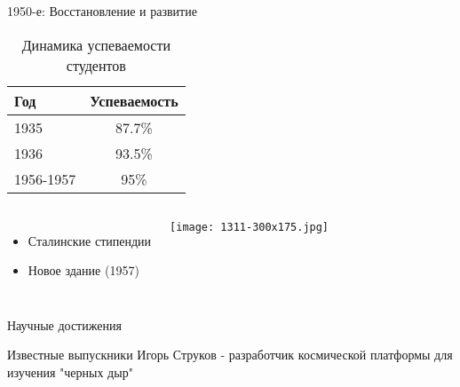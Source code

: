 \documentclass[12pt]{beamer}
\begin{document}
\begin{frame}{1950-е: Восстановление и развитие}
    \begin{table}
        \centering
        \begin{tabular}{lc}
            \toprule
            Год & Успеваемость \\
            \midrule
            1935 & 87.7\% \\
            1936 & 93.5\% \\
            1956-1957 & 95\% \\
            \bottomrule
        \end{tabular}
        \caption{Динамика успеваемости студентов}
    \end{table}
    
    \begin{columns}
        \begin{itemize}
            \item Сталинские стипендии
            \item Новое здание (1957)
        \end{itemize}
        
        \texttt{[image: 1311-300x175.jpg]}
    \end{columns}
\end{frame}

\begin{frame}{Научные достижения}
    \centering
    
    \vspace{0.5cm}
    \begin{exampleblock}{Известные выпускники}
        Игорь Струков - разработчик космической платформы для изучения "черных дыр"
    \end{exampleblock}
\end{frame}
\end{document}
